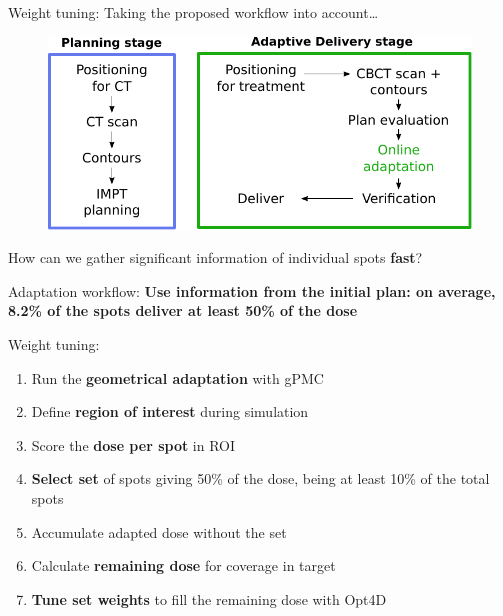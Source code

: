 \begin{frame}[c]{Weight tuning:}
     Taking the proposed workflow into account\ldots
	\begin{figure}[h]
		\includegraphics[scale=0.7]{imgs/workflow_adaptive_1.pdf}
	\end{figure}
    How can we gather significant information of individual spots \textbf{fast}?
\end{frame}


\begin{frame}[c]{Adaptation workflow:}
	\textbf{Use information from the initial plan: on average, 8.2\% of the spots deliver at least 50\% of the dose}
	\pause
	
	Weight tuning:
    \begin{enumerate}
    	\item Run the \textbf{geometrical adaptation} with gPMC
    	\item Define \textbf{region of interest} during simulation
    	\item Score the \textbf{dose per spot} in ROI
    	\item \textbf{Select set} of spots giving 50\% of the dose, being at least 10\% of the total spots
    	\item Accumulate adapted dose without the set
    	\item Calculate \textbf{remaining dose} for coverage in target
    	\item \textbf{Tune set weights} to fill the remaining dose with Opt4D
    \end{enumerate}
\end{frame}
